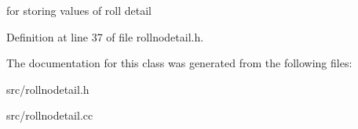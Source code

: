 for storing values of roll detail 



Definition at line 37 of file rollnodetail.\-h.



The documentation for this class was generated from the following files\-:\begin{DoxyCompactItemize}
\item 
src/rollnodetail.\-h\item 
src/rollnodetail.\-cc\end{DoxyCompactItemize}

